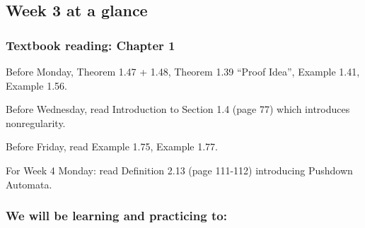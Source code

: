 

\subsection*{Week 3 at a glance}

\vspace{-15pt}

\subsubsection*{Textbook reading: Chapter 1}

\vspace{-15pt}

Before Monday, Theorem 1.47 + 1.48, Theorem 1.39 ``Proof Idea'', Example 1.41, Example 1.56.

Before Wednesday, read Introduction to Section 1.4 (page 77) which introduces nonregularity.

Before Friday, read Example 1.75, Example 1.77.

For Week 4 Monday: read Definition 2.13 (page 111-112) introducing Pushdown Automata.

\vspace{-20pt}

\subsubsection*{We will be learning and practicing to:}

\vspace{-15pt}

